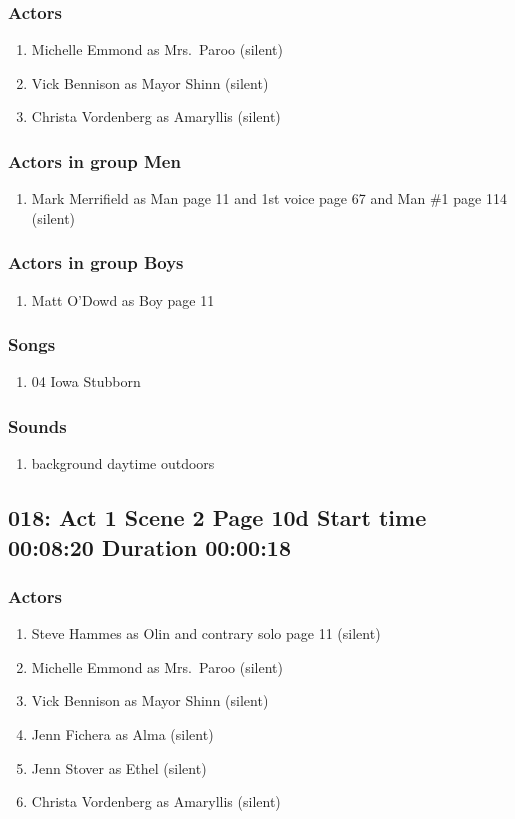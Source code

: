 \subsubsection{Actors}
\begin{enumerate}
\item Michelle Emmond as Mrs.~Paroo (silent)
\item Vick Bennison as Mayor Shinn (silent)
\item Christa Vordenberg as Amaryllis (silent)
\end{enumerate}
\subsubsection{Actors in group Men}
\begin{enumerate}
\item Mark Merrifield as Man page 11 and 1st voice page 67 and Man \#1 page 114 (silent)
\end{enumerate}
\subsubsection{Actors in group Boys}
\begin{enumerate}
\item Matt O'Dowd as Boy page 11
\end{enumerate}

\subsubsection{Songs}
\begin{enumerate}
\item 04 Iowa Stubborn
\end{enumerate}\subsubsection{Sounds}
\begin{enumerate}
\item background daytime outdoors
\end{enumerate}
\subsection{018: Act 1 Scene 2 Page 10d Start time 00:08:20 Duration 00:00:18}

\subsubsection{Actors}
\begin{enumerate}
\item Steve Hammes as Olin and contrary solo page 11 (silent)
\item Michelle Emmond as Mrs.~Paroo (silent)
\item Vick Bennison as Mayor Shinn (silent)
\item Jenn Fichera as Alma (silent)
\item Jenn Stover as Ethel (silent)
\item Christa Vordenberg as Amaryllis (silent)
\end{enumerate}
